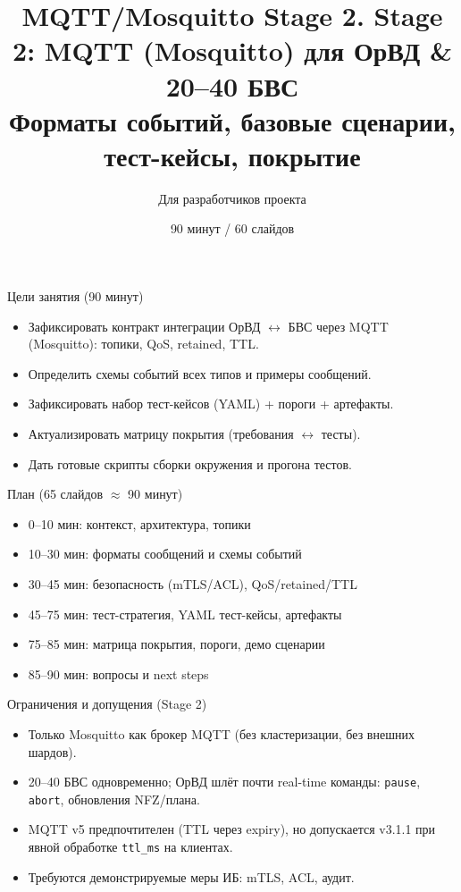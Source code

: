 \documentclass[aspectratio=169]{beamer}
\title{MQTT/Mosquitto Stage 2. Stage 2: MQTT (Mosquitto) для ОрВД \& 20--40 БВС\\Форматы событий, базовые сценарии, тест-кейсы, покрытие}
\author{Для разработчиков проекта}
\date{90 минут / 60 слайдов}
\begin{document}
\begin{frame}
\titlepage{}
\end{frame}

\begin{frame}[fragile]{Цели занятия (90 минут)}
\begin{itemize}
  \item Зафиксировать контракт интеграции ОрВД $\leftrightarrow$ БВС через MQTT (Mosquitto): топики, QoS, retained, TTL.
  \item Определить схемы событий всех типов и примеры сообщений.
  \item Зафиксировать набор тест-кейсов (YAML) + пороги + артефакты.
  \item Актуализировать матрицу покрытия (требования $\leftrightarrow$ тесты).
  \item Дать готовые скрипты сборки окружения и прогона тестов.
\end{itemize}
\end{frame}

\begin{frame}[fragile]{План (65 слайдов $\approx$ 90 минут)}
\begin{itemize}
  \item 0--10 мин: контекст, архитектура, топики
  \item 10--30 мин: форматы сообщений и схемы событий
  \item 30--45 мин: безопасность (mTLS/ACL), QoS/retained/TTL
  \item 45--75 мин: тест-стратегия, YAML тест-кейсы, артефакты
  \item 75--85 мин: матрица покрытия, пороги, демо сценарии
  \item 85--90 мин: вопросы и next steps
\end{itemize}
\end{frame}

\begin{frame}[fragile]{Ограничения и допущения (Stage 2)}
\begin{itemize}
  \item Только Mosquitto как брокер MQTT (без кластеризации, без внешних шардов).
  \item 20--40 БВС одновременно; ОрВД шлёт почти real-time команды: \texttt{pause}, \texttt{abort}, обновления NFZ/плана.
  \item MQTT v5 предпочтителен (TTL через expiry), но допускается v3.1.1 при явной обработке \texttt{ttl\_ms} на клиентах.
  \item Требуются демонстрируемые меры ИБ: mTLS, ACL, аудит.
\end{itemize}
\end{frame}
\end{document}
